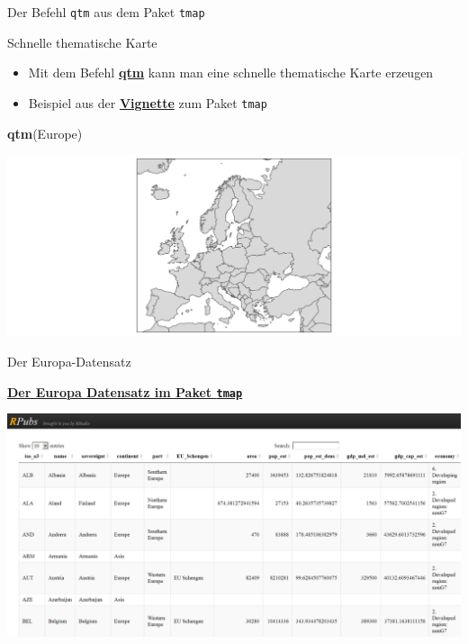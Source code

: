 \documentclass[ignorenonframetext,]{beamer}
\newenvironment{Shaded}{\begin{snugshade}}{\end{snugshade}}
\newcommand{\KeywordTok}[1]{\textcolor[rgb]{0.13,0.29,0.53}{\textbf{#1}}}
\newcommand{\NormalTok}[1]{#1}
\begin{document}
\begin{frame}[fragile]{Der Befehl \texttt{qtm} aus dem Paket
\texttt{tmap}}
\protect\hypertarget{der-befehl-qtm-aus-dem-paket-tmap}{}

\begin{block}{Schnelle thematische Karte}

\begin{itemize}
\item
  Mit dem Befehl
  \href{https://cran.r-project.org/web/packages/tmap/vignettes/tmap-nutshell.html}{\textbf{qtm}}
  kann man eine schnelle thematische Karte erzeugen
\item
  Beispiel aus der
  \href{https://cran.r-project.org/web/packages/tmap/vignettes/tmap-nutshell.html}{\textbf{Vignette}}
  zum Paket \texttt{tmap}
\end{itemize}

\begin{Shaded}
\begin{Highlighting}[]
\KeywordTok{qtm}\NormalTok{(Europe)}
\end{Highlighting}
\end{Shaded}

\includegraphics{A4_tmap_files/figure-beamer/unnamed-chunk-5-1.pdf}

\end{block}

\end{frame}

\begin{frame}[fragile]{Der Europa-Datensatz}
\protect\hypertarget{der-europa-datensatz}{}

\begin{block}{\href{http://rpubs.com/Japhilko82/tmap_europe_dataset}{\textbf{Der
Europa Datensatz im Paket \texttt{tmap}}}}

\includegraphics{figure/tmap_europe.PNG}

\end{block}

\end{frame}
\end{document}
